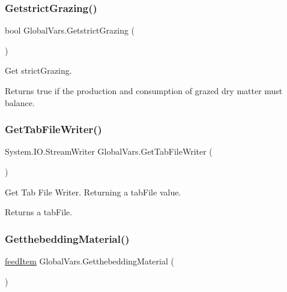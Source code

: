 \subsubsection{\texorpdfstring{GetstrictGrazing()}{GetstrictGrazing()}}
{\footnotesize\ttfamily bool Global\+Vars.\+Getstrict\+Grazing (\begin{DoxyParamCaption}{ }\end{DoxyParamCaption})\hspace{0.3cm}{\ttfamily [inline]}}



Get strict\+Grazing. 

\begin{DoxyReturn}{Returns}
true if the production and consumption of grazed dry matter must balance. 
\end{DoxyReturn}
\mbox{\label{class_global_vars_ae46e7193670046608e26f2342ce6287d}} 
\subsubsection{\texorpdfstring{GetTabFileWriter()}{GetTabFileWriter()}}
{\footnotesize\ttfamily System.\+I\+O.\+Stream\+Writer Global\+Vars.\+Get\+Tab\+File\+Writer (\begin{DoxyParamCaption}{ }\end{DoxyParamCaption})\hspace{0.3cm}{\ttfamily [inline]}}



Get Tab File Writer. Returning a tab\+File value. 

\begin{DoxyReturn}{Returns}
a tab\+File. 
\end{DoxyReturn}
\mbox{\label{class_global_vars_a94dc7347c7b4fc213dc302d321b33b9e}} 
\subsubsection{\texorpdfstring{GetthebeddingMaterial()}{GetthebeddingMaterial()}}
{\footnotesize\ttfamily \mbox{\hyperlink{classfeed_item}{feed\+Item}} Global\+Vars.\+Getthebedding\+Material (\begin{DoxyParamCaption}{ }\end{DoxyParamCaption})\hspace{0.3cm}{\ttfamily [inline]}}



